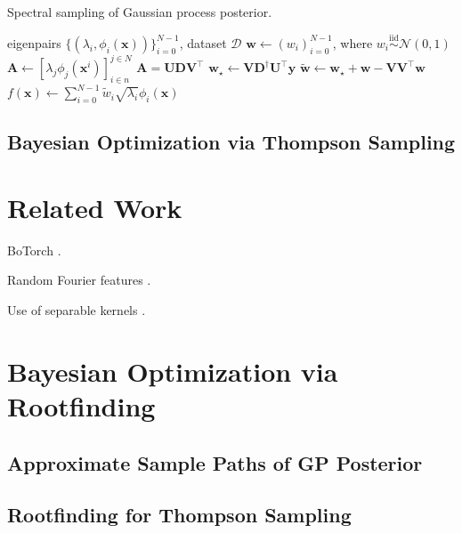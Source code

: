 \documentclass{article}
\begin{document}
\begin{algorithm}[t]
	\caption{Spectral sampling of Gaussian process posterior.}
	\label{alg:sampostGP}
	\begin{algorithmic}[1] %
		\Input eigenpairs $\{(\lambda_i, \phi_i(\mathbf{x}))\}_{i=0}^{N-1}$,
		dataset $\mathcal{D}$
		\State $\mathbf{w} \gets (w_i)_{i=0}^{N-1}$, where
		$w_i \overset{\text{iid}}{\sim} \mathcal{N}(0,1)$
		\State $\mathbf{A} \gets [\lambda_j \phi_j(\mathbf{x}^i)]_{i \in n}^{j \in N}$
		\State $\mathbf{A} = \mathbf{U} \mathbf{D} \mathbf{V}^\intercal$ 
		\State $\mathbf{w}_\star \gets \mathbf{V} \mathbf{D}^\dagger \mathbf{U}^\intercal \mathbf{y}$
		\State $\widetilde{\mathbf{w}} \gets \mathbf{w}_\star + \mathbf{w} - \mathbf{V} \mathbf{V}^\intercal \mathbf{w}$
		\State \Return $f(\mathbf{x}) \gets \sum_{i=0}^{N-1} \widetilde{w}_i \sqrt{\lambda_i} \phi_i(\mathbf{x})$
	\end{algorithmic}
\end{algorithm}

\subsection{Bayesian Optimization via Thompson Sampling}



\section{Related Work}

BoTorch \cite{Balandat2020}.

Random Fourier features \cite{Rahimi2007}.

Use of separable kernels \cite{Stegle2011,Hensman2018}.

\section{Bayesian Optimization via Rootfinding}

\subsection{Approximate Sample Paths of GP Posterior}


\subsection{Rootfinding for Thompson Sampling}
\end{document}
